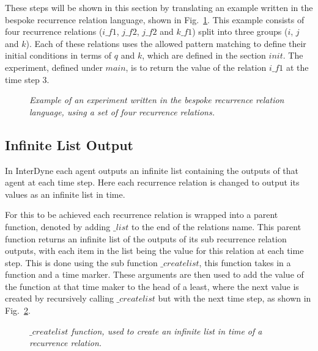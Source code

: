 \documentclass{article}
\begin{document}
These steps will be shown in this section by translating an example written in the bespoke recurrence relation language, shown in Fig.~\ref{fig:rre1}. This example consists of four recurrence relations ($i\_f1$, $j\_f2$, $j\_f2$ and $k\_f1$) split into three groups ($i$, $j$ and $k$). Each of these relations uses the allowed pattern matching to define their initial conditions in terms of $q$ and $k$, which are defined in the section $init$. The experiment, defined under $main$, is to return the value of the relation $i\_f1$ at the time step 3.  
\begin{figure}[H]
	\centering
	
	\caption{\it Example of an experiment written in the bespoke recurrence relation language, using a set of four recurrence relations.}
	\label{fig:rre1}
\end{figure} 





\subsection{Infinite List Output}
In InterDyne each agent outputs an infinite list containing the outputs of that agent at each time step. Here each recurrence relation is changed to output its values as an infinite list in time.

For this to be achieved each recurrence relation is wrapped into a parent function, denoted by adding $\_list$ to the end of the relations name. This parent function returns an infinite list of the outputs of its sub recurrence relation outputs, with each item in the list being the value for this relation at each time step. This is done using the sub function $\_createlist$, this function takes in a function and a time marker. These arguments are then used to add the value of the function at that time maker to the head of a least, where the next value is created by recursively calling $\_createlist$ but with the next time step, as shown in Fig.~\ref{fig:cl1}.
\begin{figure}[H]
	\centering
	
	\caption{\it $\_createlist$ function, used to create an infinite list in time of a recurrence relation.}
	\label{fig:cl1}
\end{figure} 
 
\end{document}
